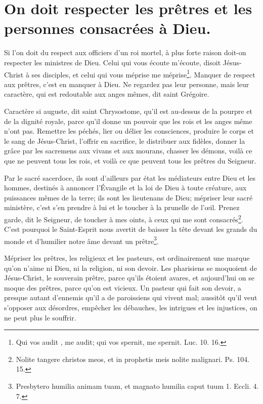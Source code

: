 \documentclass[instructions.tex]{subfiles}
\begin{document}
 
\chapter{On doit respecter les prêtres et les personnes consacrées à Dieu.}
 
\primo Si l'on doit du respect aux officiers d'un roi mortel, à plus forte raison doit-on respecter les ministres de Dieu. Celui qui vous écoute m'écoute, disoit Jésus-Christ à ses disciples, et celui qui vous méprise me méprise\footnote{Qui vos audit , me audit; qui vos spernit, me spernit. Luc. 10. 16.}. Manquer de respect aux prêtres, c'est en manquer à Dieu. Ne regardez pas leur personne, mais leur caractère, qui est redoutable aux anges mêmes, dit saint Grégoire.
 
Caractère si auguste, dit saint Chrysostome, qu'il est au-dessus de la pourpre et de la dignité royale, parce qu'il donne un pouvoir que les rois et les anges même n'ont pas. Remettre les péchés, lier ou délier les consciences, produire le corps et le sang de Jésus-Christ, l'offrir en sacrifice, le distribuer aux fidèles, donner la grâce par les sacremens aux vivans et aux mourans, chasser les démons, voilà ce que ne peuvent tous les rois, et voilà ce que peuvent tous les prêtres du Seigneur.
 
Par le sacré sacerdoce, ils sont d'ailleurs par état les médiateurs entre Dieu et les hommes, destinés à annoncer l'Évangile et la loi de Dieu à toute créature, aux puissances mêmes de la terre; ils sont les lieutenans de Dieu; mépriser leur sacré ministère, c'est s'en prendre à lui et le toucher à la prunelle de l'œil. Prenez garde, dit le Seigneur, de toucher à mes oints, à ceux qui me sont consacrés\footnote{Nolite tangere christos meos, et in prophetis meis nolite malignari. Ps. 104. 15.}. C'est pourquoi le Saint-Esprit nous avertit de baisser la tête devant les grands du monde et d'humilier notre âme devant un prêtre\footnote{Presbytero humilia animam tuam, et magnato humilia caput tuum 1. Eccli. 4. 7.}.
 
\secundo Mépriser les prêtres, les religieux et les pasteurs, est ordinairement une marque qu'on n'aime ni Dieu, ni la religion, ni son devoir. Les pharisiens se moquoient de Jésus-Christ, le souverain prêtre, parce qu'ils étoient avares, et aujourd'hui on se moque des prêtres, parce qu'on est vicieux. Un pasteur qui fait son devoir, a presque autant d'ennemis qu'il a de paroissiens qui vivent mal; aussitôt qu'il veut s'opposer aux désordres, empêcher les débauches, les intrigues et les injustices, on ne peut plus le souffrir.
 
\end{document}
